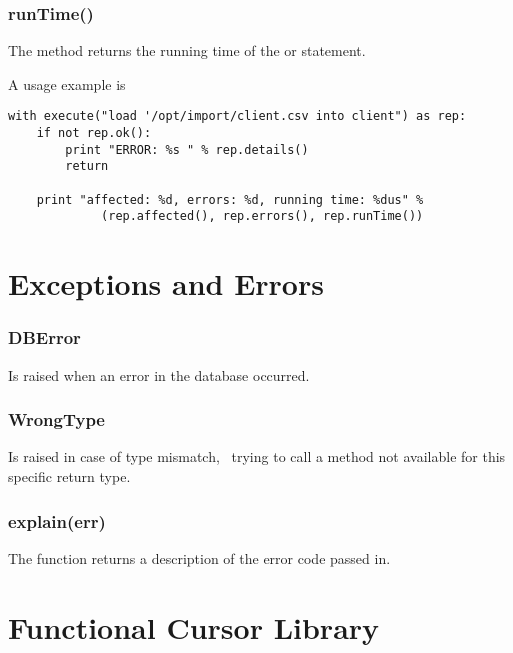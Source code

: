 \subsubsection{runTime()}
The method returns the running time of 
the  or  statement.

A usage example is

\begin{python}
\begin{lstlisting}
with execute("load '/opt/import/client.csv into client") as rep:
    if not rep.ok():
        print "ERROR: %s " % rep.details()
        return
    
    print "affected: %d, errors: %d, running time: %dus" % 
             (rep.affected(), rep.errors(), rep.runTime())
\end{lstlisting}
\end{python}

\section{Exceptions and Errors}
\subsubsection{DBError}
Is raised when an error in the database occurred.

\subsubsection{WrongType}
Is raised in case of type mismatch, \ie\
trying to call a method not available for
this specific return type.

\subsubsection{explain(err)}
The function  returns
a description of the error code passed in.

\section{Functional Cursor Library}\label{sec_func}
